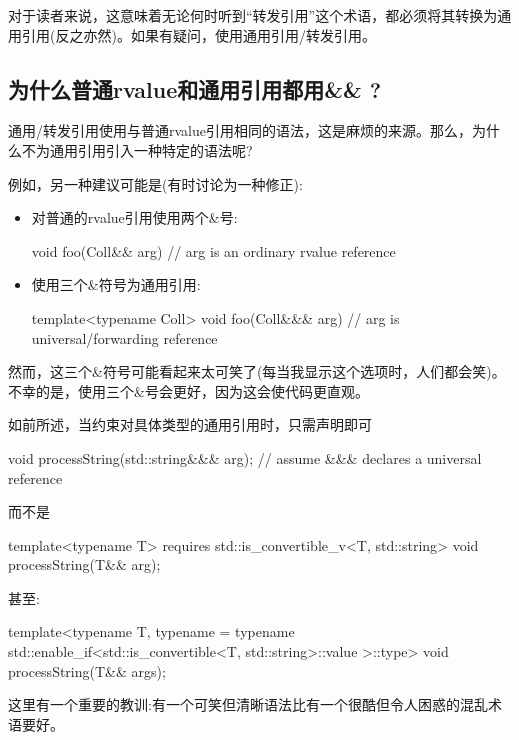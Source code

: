对于读者来说，这意味着无论何时听到“转发引用”这个术语，都必须将其转换为通用引用(反之亦然)。如果有疑问，使用通用引用/转发引用。

\subsection{为什么普通rvalue和通用引用都用\&\& ?}

通用/转发引用使用与普通rvalue引用相同的语法，这是麻烦的来源。那么，为什么不为通用引用引入一种特定的语法呢?

例如，另一种建议可能是(有时讨论为一种修正):

\begin{itemize}
\item 对普通的rvalue引用使用两个\&号:
\begin{cppcode}
void foo(Coll&& arg) // arg is an ordinary rvalue reference
\end{cppcode}
\item 使用三个\&符号为通用引用:
\begin{cppcode}
template<typename Coll>
void foo(Coll&&& arg) // arg is universal/forwarding reference
\end{cppcode}
\end{itemize}

然而，这三个\&符号可能看起来太可笑了(每当我显示这个选项时，人们都会笑)。不幸的是，使用三个\&号会更好，因为这会使代码更直观。

如前所述，当约束对具体类型的通用引用时，只需声明即可

\begin{cppcode}
void processString(std::string&&& arg); // assume &&& declares a universal reference
\end{cppcode}

而不是

\begin{cppcode}
template<typename T>
requires std::is_convertible_v<T, std::string>
void processString(T&& arg);
\end{cppcode}

甚至:

\begin{cppcode}
template<typename T,
	typename =
		typename std::enable_if<std::is_convertible<T, std::string>::value
			>::type>
void processString(T&& args);
\end{cppcode}

这里有一个重要的教训:有一个可笑但清晰语法比有一个很酷但令人困惑的混乱术语要好。

















